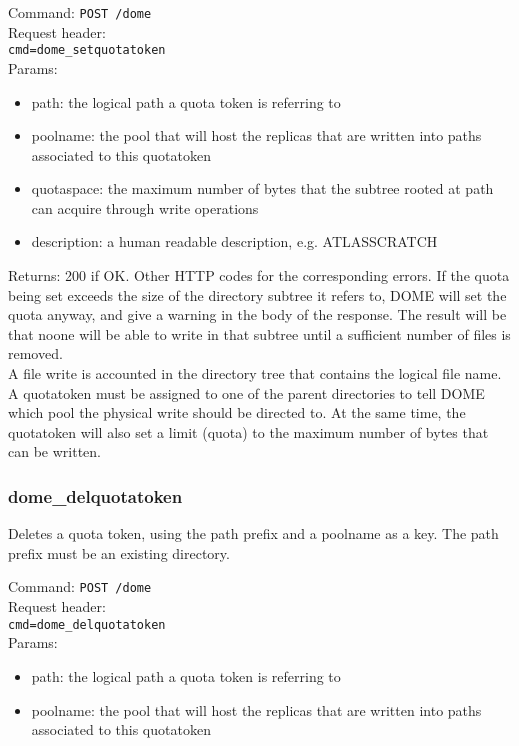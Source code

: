 \documentclass[a4paper,10pt]{scrreprt}
\begin{document}
Command:
\lstinline"POST /dome"\\
Request header:\\
\lstinline"cmd=dome_setquotatoken"\\
Params:
\begin{itemize}
 \item path: the logical path a quota token is referring to
 \item poolname: the pool that will host the replicas that are written into paths associated to this quotatoken
 \item quotaspace: the maximum number of bytes that the subtree rooted at path can acquire through write operations
 \item description: a human readable description, e.g. ATLASSCRATCH
\end{itemize}

Returns: 200 if OK. Other HTTP codes for the corresponding errors. If the quota being set exceeds the size of the directory subtree it refers to, DOME will set the quota anyway, and give a warning in the body of the response. The result will be that noone will be able to write in that subtree until a sufficient number of files is removed.\\

A file write is accounted in the directory tree that contains the logical file name. A quotatoken must be assigned to one of the parent directories to tell DOME which pool the physical write should be directed to.
At the same time, the quotatoken will also set a limit (quota) to the maximum number of bytes that can be written.

\subsubsection{dome\_delquotatoken}
Deletes a quota token, using the path prefix and a poolname as a key. The path prefix must be an existing directory.

Command:
\lstinline"POST /dome"\\
Request header:\\
\lstinline"cmd=dome_delquotatoken"\\
Params:\\
\begin{itemize}
 \item path: the logical path a quota token is referring to
 \item poolname: the pool that will host the replicas that are written into paths associated to this quotatoken
\end{itemize}
\end{document}
